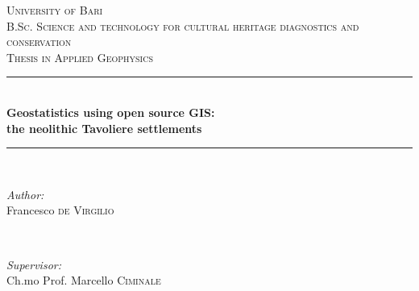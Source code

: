     \begin{titlepage}
        \newcommand{\HRule}{\rule{\linewidth}{0.5mm}} %

        \center %
         

        \textsc{
            ~\\
            ~\\
            ~\\
            ~\\
            ~\\
            \LARGE University of Bari
        }\\[1.5cm] %
        \textsc{\Large B.Sc. Science and technology for cultural heritage diagnostics and conservation}\\[0.5cm] %
        \textsc{\large Thesis in Applied Geophysics}\\[0.5cm] %


        \HRule \\[0.4cm]
        { \Large \bfseries Geostatistics using open source GIS:\\the neolithic Tavoliere settlements}\\[0.4cm] %
        \HRule \\[1.5cm]
         

        \begin{minipage}{0.4\textwidth}
            \begin{flushleft} \normalsize
                \emph{Author:}\\
                Francesco \textsc{de Virgilio} %
            \end{flushleft}
        \end{minipage}
        ~
        \begin{minipage}{0.4\textwidth}
            \begin{flushright} \normalsize
                \emph{Supervisor:} \\
                Ch.mo Prof. Marcello \textsc{Ciminale} %
            \end{flushright}
        \end{minipage}\\[4cm]


\end{titlepage}
